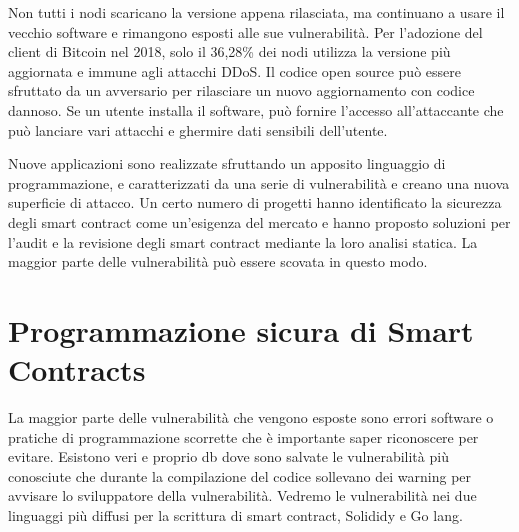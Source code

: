Non tutti i nodi scaricano la
versione appena rilasciata,
ma continuano a usare il
vecchio software e
rimangono esposti alle sue
vulnerabilità.
Per l'adozione del client di Bitcoin nel 2018, solo il 36,28\% dei nodi utilizza la versione più aggiornata e immune agli attacchi DDoS.
Il codice open source può essere sfruttato da un avversario per
rilasciare un nuovo aggiornamento con codice dannoso. Se un
utente installa il software, può fornire l'accesso all'attaccante che
può lanciare vari attacchi e ghermire dati sensibili dell’utente.

Nuove applicazioni sono realizzate sfruttando un apposito linguaggio
di programmazione, e caratterizzati da una serie di vulnerabilità e
creano una nuova superficie di attacco.
Un certo numero di progetti hanno
identificato la sicurezza degli smart
contract come un'esigenza del mercato e
hanno proposto soluzioni per l'audit e la
revisione degli smart contract mediante la
loro analisi statica. La maggior parte delle vulnerabilità può essere scovata in questo modo.

\section{Programmazione sicura di Smart Contracts}
La maggior parte delle vulnerabilità che vengono esposte sono errori software o pratiche di programmazione scorrette che è importante saper riconoscere per evitare. Esistono veri e proprio db dove sono salvate le vulnerabilità più conosciute che durante la compilazione del codice sollevano dei warning per avvisare lo sviluppatore della vulnerabilità. Vedremo le vulnerabilità nei due linguaggi più diffusi per la scrittura di smart contract, Solididy e Go lang. 

